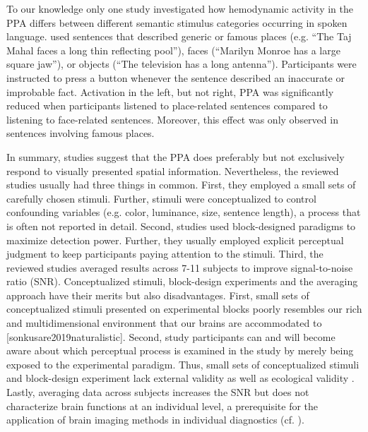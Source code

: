 \documentclass[english]{article}
\begin{document}
To our knowledge only one study \citep{aziz2008modulation} investigated how
hemodynamic activity in the PPA differs between different semantic stimulus
categories occurring in spoken language.
\cite{aziz2008modulation} used sentences that described generic or famous places
(e.g. ``The Taj Mahal faces a long thin reflecting pool''), faces (``Marilyn
Monroe has a large square jaw''), or objects (``The television has a long
antenna'').
Participants were instructed to press a button whenever the sentence described
an inaccurate or improbable fact.
Activation in the left, but not right, PPA was significantly reduced when
participants listened to place-related sentences compared to listening to
face-related sentences. Moreover, this effect was only observed in sentences
involving famous places.

In summary, studies suggest that the PPA does preferably but not exclusively
respond to visually presented spatial information.
Nevertheless, the reviewed studies usually had three things in common.
First, they employed a small sets of carefully chosen stimuli. Further, stimuli
were conceptualized to control confounding variables (e.g. color, luminance,
size, sentence length), a process that is often not reported in
detail.
Second, studies used block-designed paradigms to maximize detection power.
Further, they usually employed explicit perceptual judgment to keep participants
paying attention to the stimuli.
Third, the reviewed studies averaged results across 7-11 subjects to improve
signal-to-noise ratio (SNR).
Conceptualized stimuli, block-design experiments and the averaging approach have
their merits but also disadvantages.
First, small sets of conceptualized stimuli presented on experimental blocks
poorly resembles our rich and multidimensional environment that our brains are
accommodated to [sonkusare2019naturalistic].
Second, study participants can and will become aware about which perceptual
process is examined in the study by merely being exposed to the experimental
paradigm.
Thus, small sets of conceptualized stimuli and block-design experiment lack
external validity \citep{westfall2016fixing} as well as ecological validity
\citep{hasson2004intersubject}.
Lastly, averaging data across subjects increases the SNR but does not
characterize brain functions at an individual level, a prerequisite for the
application of brain imaging methods in individual diagnostics (cf.
\cite{dubois2016building, eickhoff2020towards}).
\end{document}
